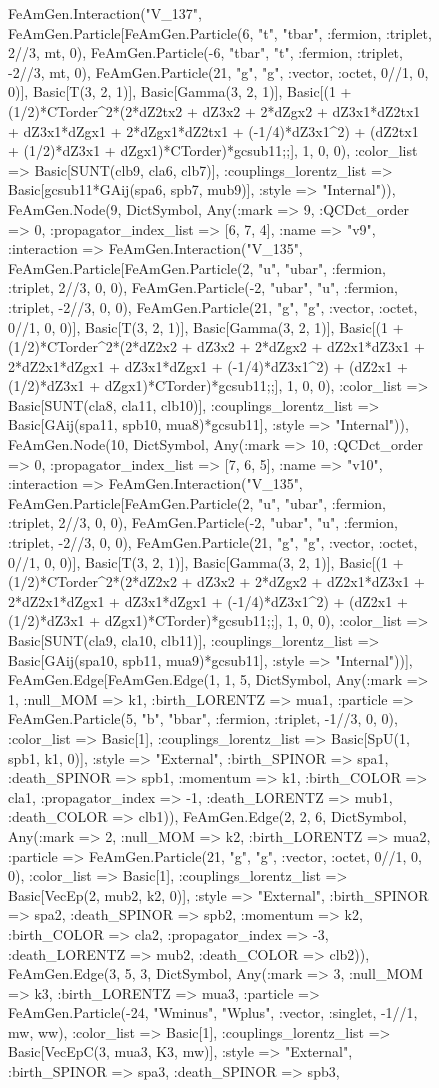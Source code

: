 \documentclass{revtex4}
\begin{document}
\begin{figure}[!htb]
\begin{center}
{FeAmGen.Interaction("V_137", FeAmGen.Particle[FeAmGen.Particle(6, "t", "tbar", :fermion, :triplet, 2//3, mt, 0), FeAmGen.Particle(-6, "tbar", "t", :fermion, :triplet, -2//3, mt, 0), FeAmGen.Particle(21, "g", "g", :vector, :octet, 0//1, 0, 0)], Basic[T(3, 2, 1)], Basic[Gamma(3, 2, 1)], Basic[(1 + (1/2)*CTorder^2*(2*dZ2tx2 + dZ3x2 + 2*dZgx2 + dZ3x1*dZ2tx1 + dZ3x1*dZgx1 + 2*dZgx1*dZ2tx1 + (-1/4)*dZ3x1^2) + (dZ2tx1 + (1/2)*dZ3x1 + dZgx1)*CTorder)*gcsub11;;], 1, 0, 0), :color_list => Basic[SUNT(clb9, cla6, clb7)], :couplings_lorentz_list => Basic[gcsub11*GAij(spa6, spb7, mub9)], :style => "Internal")), FeAmGen.Node(9, Dict{Symbol, Any}(:mark => 9, :QCDct_order => 0, :propagator_index_list => [6, 7, 4], :name => "v9", :interaction => FeAmGen.Interaction("V_135", FeAmGen.Particle[FeAmGen.Particle(2, "u", "ubar", :fermion, :triplet, 2//3, 0, 0), FeAmGen.Particle(-2, "ubar", "u", :fermion, :triplet, -2//3, 0, 0), FeAmGen.Particle(21, "g", "g", :vector, :octet, 0//1, 0, 0)], Basic[T(3, 2, 1)], Basic[Gamma(3, 2, 1)], Basic[(1 + (1/2)*CTorder^2*(2*dZ2x2 + dZ3x2 + 2*dZgx2 + dZ2x1*dZ3x1 + 2*dZ2x1*dZgx1 + dZ3x1*dZgx1 + (-1/4)*dZ3x1^2) + (dZ2x1 + (1/2)*dZ3x1 + dZgx1)*CTorder)*gcsub11;;], 1, 0, 0), :color_list => Basic[SUNT(cla8, cla11, clb10)], :couplings_lorentz_list => Basic[GAij(spa11, spb10, mua8)*gcsub11], :style => "Internal")), FeAmGen.Node(10, Dict{Symbol, Any}(:mark => 10, :QCDct_order => 0, :propagator_index_list => [7, 6, 5], :name => "v10", :interaction => FeAmGen.Interaction("V_135", FeAmGen.Particle[FeAmGen.Particle(2, "u", "ubar", :fermion, :triplet, 2//3, 0, 0), FeAmGen.Particle(-2, "ubar", "u", :fermion, :triplet, -2//3, 0, 0), FeAmGen.Particle(21, "g", "g", :vector, :octet, 0//1, 0, 0)], Basic[T(3, 2, 1)], Basic[Gamma(3, 2, 1)], Basic[(1 + (1/2)*CTorder^2*(2*dZ2x2 + dZ3x2 + 2*dZgx2 + dZ2x1*dZ3x1 + 2*dZ2x1*dZgx1 + dZ3x1*dZgx1 + (-1/4)*dZ3x1^2) + (dZ2x1 + (1/2)*dZ3x1 + dZgx1)*CTorder)*gcsub11;;], 1, 0, 0), :color_list => Basic[SUNT(cla9, cla10, clb11)], :couplings_lorentz_list => Basic[GAij(spa10, spb11, mua9)*gcsub11], :style => "Internal"))], FeAmGen.Edge[FeAmGen.Edge(1, 1, 5, Dict{Symbol, Any}(:mark => 1, :null_MOM => k1, :birth_LORENTZ => mua1, :particle => FeAmGen.Particle(5, "b", "bbar", :fermion, :triplet, -1//3, 0, 0), :color_list => Basic[1], :couplings_lorentz_list => Basic[SpU(1, spb1, k1, 0)], :style => "External", :birth_SPINOR => spa1, :death_SPINOR => spb1, :momentum => k1, :birth_COLOR => cla1, :propagator_index => -1, :death_LORENTZ => mub1, :death_COLOR => clb1)), FeAmGen.Edge(2, 2, 6, Dict{Symbol, Any}(:mark => 2, :null_MOM => k2, :birth_LORENTZ => mua2, :particle => FeAmGen.Particle(21, "g", "g", :vector, :octet, 0//1, 0, 0), :color_list => Basic[1], :couplings_lorentz_list => Basic[VecEp(2, mub2, k2, 0)], :style => "External", :birth_SPINOR => spa2, :death_SPINOR => spb2, :momentum => k2, :birth_COLOR => cla2, :propagator_index => -3, :death_LORENTZ => mub2, :death_COLOR => clb2)), FeAmGen.Edge(3, 5, 3, Dict{Symbol, Any}(:mark => 3, :null_MOM => k3, :birth_LORENTZ => mua3, :particle => FeAmGen.Particle(-24, "Wminus", "Wplus", :vector, :singlet, -1//1, mw, ww), :color_list => Basic[1], :couplings_lorentz_list => Basic[VecEpC(3, mua3, K3, mw)], :style => "External", :birth_SPINOR => spa3, :death_SPINOR => spb3, }
\end{center}
\end{figure}
\end{document}
